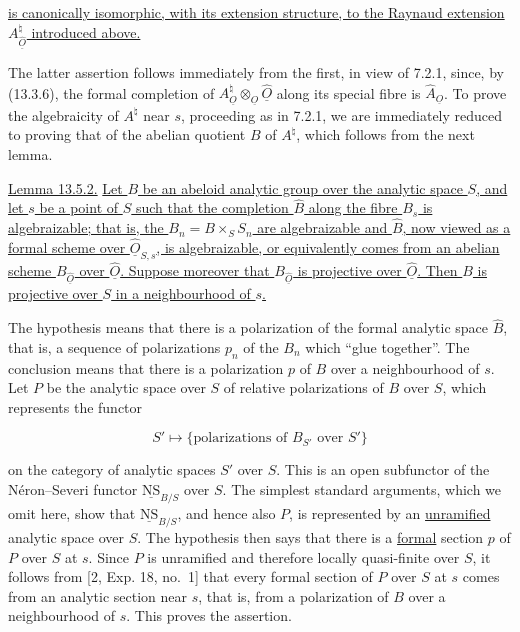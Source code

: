 \noindent
\underline{is canonically isomorphic, with its extension structure, to
the Raynaud extension $A^{\natural}_{\hat{\underline O}}$ introduced
above.}

The latter assertion follows immediately from the first, in view of
7.2.1, since, by (13.3.6), the formal completion of
$A^{\natural}_{\underline O}\otimes_{\underline O}\hat{\underline O}$
along its special fibre is $\hat A_{\underline O}$.  To prove the
algebraicity of $A^{\natural}$ near $s$, proceeding as in 7.2.1, we are
immediately reduced to proving that of the abelian quotient $B$ of
$A^{\natural}$, which follows from the next lemma.

\medskip
\noindent
\underline{Lemma 13.5.2.} \underline{Let $B$ be an abeloid analytic
group over the analytic space $S$, and let $s$ be a point of $S$ such
that the completion $\hat B$ along the fibre $B_s$ is algebraizable;
that is, the $B_n=B\times_S S_n$ are algebraizable and $\hat B$, now
viewed as a formal scheme over $\hat{\underline O}_{S,s}$, is
algebraizable, or equivalently comes from an abelian scheme
$B_{\hat{\underline O}}$ over $\hat{\underline O}$.  Suppose moreover
that $B_{\hat{\underline O}}$ is projective over
$\hat{\underline O}$.  Then $B$ is projective over $S$ in a
neighbourhood of $s$.}

The hypothesis means that there is a polarization of the formal
analytic space $\hat B$, that is, a sequence of polarizations $p_n$ of
the $B_n$ which ``glue together''.  The conclusion means that there is
a polarization $p$ of $B$ over a neighbourhood of $s$.  Let $P$ be the
analytic space over $S$ of relative polarizations of $B$ over $S$,
which represents the functor

\begin{equation*}
 S'\longmapsto
 \{\text{polarizations of $B_{S'}$ over $S'$}\}
\end{equation*}

\noindent
on the category of analytic spaces $S'$ over $S$.  This is an open
subfunctor of the N\'eron--Severi functor $\underline{\mathrm{NS}}_{B/S}$
over $S$.  The simplest standard arguments, which we omit here, show
that $\underline{\mathrm{NS}}_{B/S}$, and hence also $P$, is represented
by an \underline{unramified} analytic space over $S$.  The hypothesis
then says that there is a \underline{formal} section $p$ of $P$ over
$S$ at $s$.  Since $P$ is unramified and therefore locally quasi-finite
over $S$, it follows from [2, Exp. 18, no.~1] that every formal section
of $P$ over $S$ at $s$ comes from an analytic section near $s$, that is,
from a polarization of $B$ over a neighbourhood of $s$.  This proves
the assertion.

